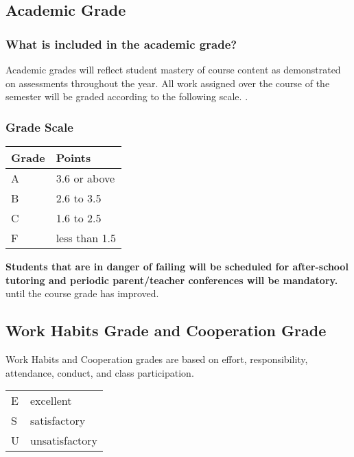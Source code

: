 \documentclass[11pt]{article}
\begin{document}
\subsection{Academic Grade}
\label{sec:org736cf4c}
\subsubsection{What is included in the academic grade?}
\label{sec:org595331e}
Academic grades will reflect student mastery of course content as demonstrated on assessments throughout the year. All work assigned over the course of the semester will be graded according to the following scale.
. 
\subsubsection{Grade Scale}
\label{sec:org96e5f2f}

\begin{center}
\begin{tabular}{ll}
\hline
Grade & Points\\[0pt]
\hline
A & 3.6 or above\\[0pt]
\hline
B & 2.6 to 3.5\\[0pt]
\hline
C & 1.6 to 2.5\\[0pt]
\hline
F & less than 1.5\\[0pt]
\hline
\end{tabular}
\end{center}

\textbf{\textbf{Students that are in danger of failing will be scheduled for after-school tutoring and periodic parent/teacher conferences will be mandatory.}} until the course grade has improved.

\subsection{Work Habits Grade and Cooperation Grade}
\label{sec:orgbe9df1c}

Work Habits and Cooperation grades are based on effort, responsibility, attendance, conduct, and class participation. 
\begin{center}
\begin{tabular}{ll}
\hline
E & excellent\\[0pt]
S & satisfactory\\[0pt]
U & unsatisfactory\\[0pt]
\hline
\end{tabular}
\end{center}
\end{document}
